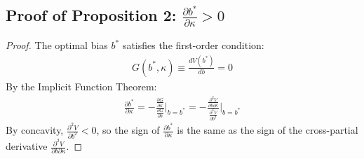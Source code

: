 \subsection{Proof of Proposition 2: $\frac{\partial b^*}{\partial \kappa} > 0$}

\begin{proof}
The optimal bias $b^*$ satisfies the first-order condition:
\begin{align}
G(b^*, \kappa) \equiv \frac{dV(b^*)}{db} = 0 \label{eq:foc}
\end{align}
By the Implicit Function Theorem:
\begin{align}
\frac{\partial b^*}{\partial \kappa} = -\frac{\frac{\partial G}{\partial \kappa}}{\frac{\partial G}{\partial b}}\bigg|_{b=b^*} = -\frac{\frac{\partial^2 V}{\partial b \partial \kappa}}{\frac{\partial^2 V}{\partial b^2}}\bigg|_{b=b^*} \label{eq:implicit}
\end{align}
By concavity, $\frac{\partial^2 V}{\partial b^2} < 0$, so the sign of $\frac{\partial b^*}{\partial \kappa}$ is the same as the sign of the cross-partial derivative $\frac{\partial^2 V}{\partial b \partial \kappa}$.


\end{proof}
